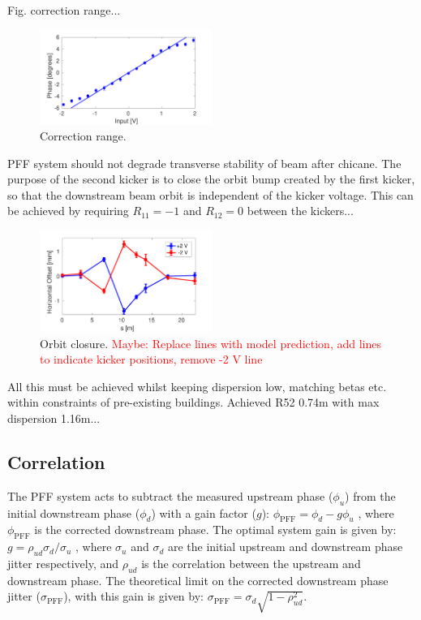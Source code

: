 \documentclass[%
 reprint,
 amsmath,amssymb,
 aps,
]{revtex4-1}
\begin{document}
Fig. correction range...

\begin{figure}
	\includegraphics[width=0.5\textwidth]{figs/corrRange}
	\caption{\label{fig:corrRange}Correction range.}
\end{figure}

PFF system should not degrade transverse stability of beam after chicane. The 
purpose of the second kicker is to close the orbit bump created by the first 
kicker, so that the downstream beam orbit is independent of the kicker voltage. 
This can be achieved by requiring \(R_{11}=-1\) and \(R_{12}=0\) between the 
kickers...

\begin{figure}
	\includegraphics[width=0.5\textwidth]{figs/orbClos}
	\caption{\label{fig:orbClos}Orbit closure. \textcolor{red}{Maybe: Replace 
	lines with model 
	prediction, add lines to indicate kicker positions, remove -2 V 
	line}}
\end{figure}

All this must be achieved whilst keeping dispersion low, matching betas etc. 
within constraints of pre-existing buildings. Achieved R52 0.74m with max 
dispersion 1.16m...

\subsection{\label{ss:r56} Correlation}

The PFF system acts to subtract the measured upstream phase (\(\phi_u\)) from 
the initial downstream phase (\(\phi_d\)) with a gain factor (\(g\)):
\(\phi_{\mathrm{PFF}} = \phi_d - g\phi_u\)
, where \(\phi_{\mathrm{PFF}}\) is the corrected downstream phase. The optimal 
system gain is given by:
\(g = \rho_{ud} \sigma_d/\sigma_u\)
, where \(\sigma_u\) and \(\sigma_d\) are the initial upstream and downstream 
phase jitter respectively, and \(\rho_{ud}\) is the correlation between the 
upstream and downstream phase. The theoretical limit on the corrected 
downstream phase jitter (\(\sigma_{\mathrm{PFF}}\)), with this gain is given by:
\(\sigma_{\mathrm{PFF}}=\sigma_d \sqrt{1-\rho_{ud}^2}\). 
\end{document}
